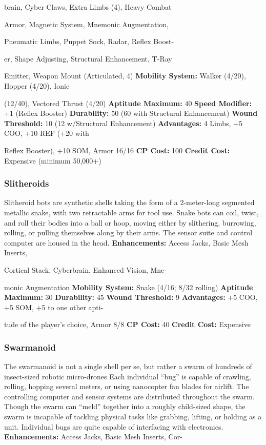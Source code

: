 brain, Cyber Claws, Extra Limbs (4), Heavy Combat 

Armor, Magnetic System, Mnemonic Augmentation, 

Pneumatic Limbs, Puppet Sock, Radar, Reflex Boost-

er, Shape Adjusting, Structural Enhancement, T-Ray 

Emitter, Weapon Mount (Articulated, 4)
\textbf{Mobility System:} Walker (4/20), Hopper (4/20), Ionic 

(12/40), Vectored Thrust (4/20)
\textbf{Aptitude Maximum: }40
\textbf{Speed Modifier: }+1 (Reflex Booster)
\textbf{Durability:} 50 (60 with Structural Enhancement)
\textbf{Wound Threshold: }10 (12 w/Structural Enhancement)
\textbf{Advantages: }4 Limbs, +5 COO, +10 REF (+20 with 

Reflex Booster), +10 SOM, Armor 16/16
\textbf{CP Cost: }100
\textbf{Credit Cost: }Expensive (minimum 50,000+)

\subsubsection{Slitheroids}

Slitheroid bots are synthetic shells taking the form of 
a 2-meter-long segmented metallic snake, with two retractable
arms for tool use. Snake bots can coil, twist,
and roll their bodies into a ball or hoop, moving either 
by slithering, burrowing, rolling, or pulling themselves 
along by their arms. The sensor suite and control computer
are housed in the head.
\textbf{Enhancements:} Access Jacks, Basic Mesh Inserts, 

Cortical Stack, Cyberbrain, Enhanced Vision, Mne-

monic Augmentation
\textbf{Mobility System:} Snake (4/16; 8/32 rolling)
\textbf{Aptitude Maximum: }30
\textbf{Durability: }45
\textbf{Wound Threshold: }9
\textbf{Advantages: }+5 COO, +5 SOM, +5 to one other apti-

tude of the player's choice, Armor 8/8
\textbf{CP Cost:} 40
\textbf{Credit Cost: }Expensive

\subsubsection{Swarmanoid}

The swarmanoid is not a single shell per se, but rather 
a swarm of hundreds of insect-sized robotic micro-drones
Each individual ``bug'' is capable of crawling,
rolling, hopping several meters, or using nanocopter 
fan blades for airlift. The controlling computer and 
sensor systems are distributed throughout the swarm. 
Though the swarm can ``meld'' together into a roughly 
child-sized shape, the swarm is incapable of tackling 
physical tasks like grabbing, lifting, or holding as a 
unit. Individual bugs are quite capable of interfacing 
with electronics.
\textbf{Enhancements:} Access Jacks, Basic Mesh Inserts, Cor-


